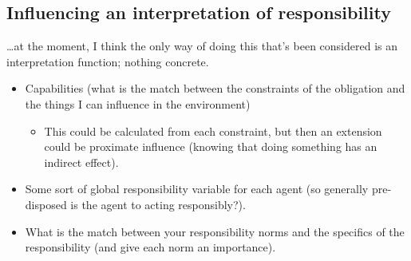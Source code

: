\documentclass{article}
\begin{document}
\subsection{Influencing an interpretation of responsibility}

\ldots{}at the moment, I think the only way of doing this that's been considered is an interpretation function; nothing concrete.\par

\begin{itemize}
\item Capabilities (what is the match between the constraints of the obligation and the things I can influence in
  the environment)
  \begin{itemize}
  \item This could be calculated from each constraint, but then an extension could be proximate influence (knowing that
    doing something has an indirect effect).
  \end{itemize}
\item Some sort of global responsibility variable for each agent (so generally pre-disposed is the agent to acting responsibly?).

\item What is the match between your responsibility norms and the specifics of the responsibility (and give each norm an importance).

\end{itemize}
\end{document}

